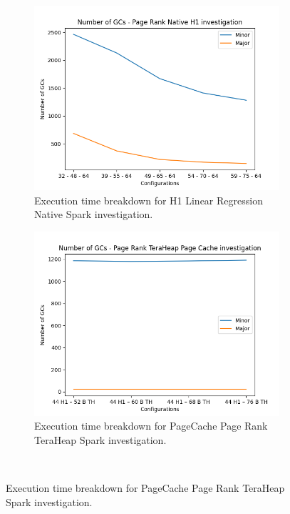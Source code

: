 \begin{figure}[htbp]
\begin{subfigure}[b]{0.48\textwidth}
    \includegraphics[width=\linewidth]{./fig/gcs_pr_h1_native.png}
    \caption{Execution time breakdown for H1 Linear Regression Native
    Spark investigation.}
    \label{fig:gcs_pr_h1_native}
\end{subfigure}

\begin{subfigure}[b]{0.48\textwidth}
    \includegraphics[width=\linewidth]{./fig/gcs_pr_pc_th.png}
    \caption{Execution time breakdown for PageCache Page Rank TeraHeap
    Spark investigation.}
    \label{fig:gcs_pr_pc_th}
\end{subfigure}\\[1em]
\end{figure}

